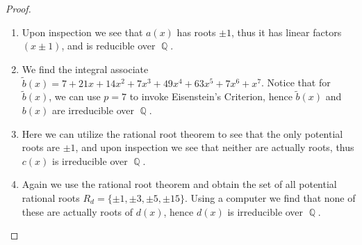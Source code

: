 \documentclass[letterpaper, 12pt]{amsart}
\DeclareMathOperator{\Q}{\mathbb{Q}}
\begin{document}
		\begin{proof} \
			\begin{enumerate}[1)]
				\item Upon inspection we see that $a(x)$ has roots $\pm 1$, thus it has linear factors $(x \pm 1)$, and is reducible over $\Q$.

				\item We find the integral associate $\tilde{b}(x) = 7 + 21x + 14x^{2} + 7x^{3} + 49x^{4} + 63x^{5} + 7x^{6} + x^{7}$.
				Notice that for $\tilde{b}(x)$, we can use $p = 7$ to invoke Eisenstein's Criterion, hence $\tilde{b}(x)$ and $b(x)$ are irreducible over $\Q$.
				
				\item Here we can utilize the rational root theorem to see that the only potential roots are $\pm 1$, and upon inspection we see that neither are actually roots, thus $c(x)$ is irreducible over $\Q$.
				
				\item Again we use the rational root theorem and obtain the set of all potential rational roots $R_{d} = \{ \pm 1, \pm 3, \pm 5, \pm 15 \}$.
				Using a computer we find that none of these are actually roots of $d(x)$, hence $d(x)$ is irreducible over $\Q$.
			\end{enumerate}
		\end{proof}
\end{document}
